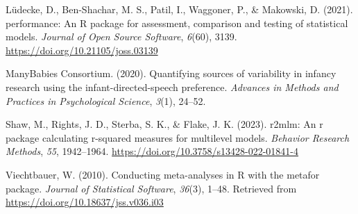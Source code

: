\documentclass[
  man, donotrepeattitle,floatsintext]{apa6}
\newlength{\cslhangindent}
\newlength{\cslentryspacingunit} %
\newenvironment{CSLReferences}[2] %
 {%
  \setlength{\parindent}{0pt}
  \ifodd #1
  \let\oldpar\par
  \def\par{\hangindent=\cslhangindent\oldpar}
  \fi
  \setlength{\parskip}{#2\cslentryspacingunit}
 }%
 {}
\begin{document}
\hypertarget{refs}{}
\begin{CSLReferences}{1}{0}
\leavevmode{}%
Lüdecke, D., Ben-Shachar, M. S., Patil, I., Waggoner, P., \& Makowski, D. (2021). {performance}: An {R} package for assessment, comparison and testing of statistical models. \emph{Journal of Open Source Software}, \emph{6}(60), 3139. \url{https://doi.org/10.21105/joss.03139}

\leavevmode{}%
ManyBabies Consortium. (2020). Quantifying sources of variability in infancy research using the infant-directed-speech preference. \emph{Advances in Methods and Practices in Psychological Science}, \emph{3}(1), 24--52.

\leavevmode{}%
Shaw, M., Rights, J. D., Sterba, S. K., \& Flake, J. K. (2023). r2mlm: An r package calculating r-squared measures for multilevel models. \emph{Behavior Research Methods}, \emph{55}, 1942--1964. \url{https://doi.org/10.3758/s13428-022-01841-4}

\leavevmode{}%
Viechtbauer, W. (2010). Conducting meta-analyses in {R} with the {metafor} package. \emph{Journal of Statistical Software}, \emph{36}(3), 1--48. Retrieved from \url{https://doi.org/10.18637/jss.v036.i03}

\end{CSLReferences}

\endgroup
\end{document}
